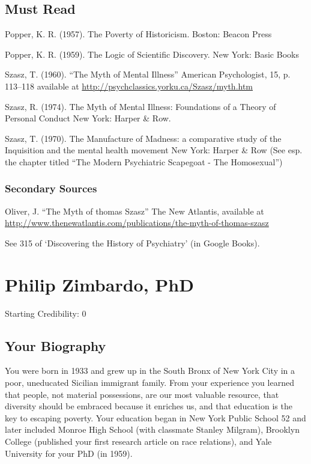 \begin{refsection}
\section{Must Read}
\label{mustread}

Popper, K. R. (1957). The Poverty of Historicism. Boston: Beacon Press

Popper, K. R. (1959). The Logic of Scientific Discovery. New York: Basic Books

Szasz, T. (1960). “The Myth of Mental Illness” American Psychologist, 15, p. 113--118 available at \url{http://psychclassics.yorku.ca/Szasz/myth.htm}

Szasz, R. (1974). The Myth of Mental Illness: Foundations of a Theory of Personal Conduct New York: Harper \& Row.

Szasz, T. (1970). The Manufacture of Madness: a comparative study of the Inquisition and the mental health movement New York: Harper \& Row (See esp. the chapter titled “The Modern Psychiatric Scapegoat - The Homosexual”)

\subsection{Secondary Sources}
\label{secondarysources}

Oliver, J. “The Myth of thomas Szasz” The New Atlantis, available at \url{http://www.thenewatlantis.com/publications/the-myth-of-thomas-szasz}

See 315 of `Discovering the History of Psychiatry' (in Google Books).

\chapter{Philip Zimbardo, PhD}
\label{philipzimbardophd}

Starting Credibility: 0

\section{Your Biography}
\label{yourbiography}

You were born in 1933 and grew up in the South Bronx of New York City in a poor, uneducated Sicilian immigrant family. From your experience you learned that people, not material possessions, are our most valuable resource, that diversity should be embraced because it enriches us, and that education is the key to escaping poverty. Your education began in New York Public School 52 and later included Monroe High School (with classmate Stanley Milgram), Brooklyn College (published your first research article on race relations), and Yale University for your PhD (in 1959).


\end{refsection}
